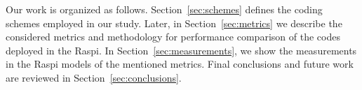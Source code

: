 Our work is organized as follows. Section~\ref{sec:schemes} defines the
coding schemes employed in our study. Later, in Section~\ref{sec:metrics}
we describe the considered metrics and methodology for performance comparison
of the codes deployed in the \ac{Raspi}. In Section~\ref{sec:measurements}, we
show the measurements in the \ac{Raspi} models of the mentioned metrics. Final
conclusions and future work are reviewed in Section~\ref{sec:conclusions}.

